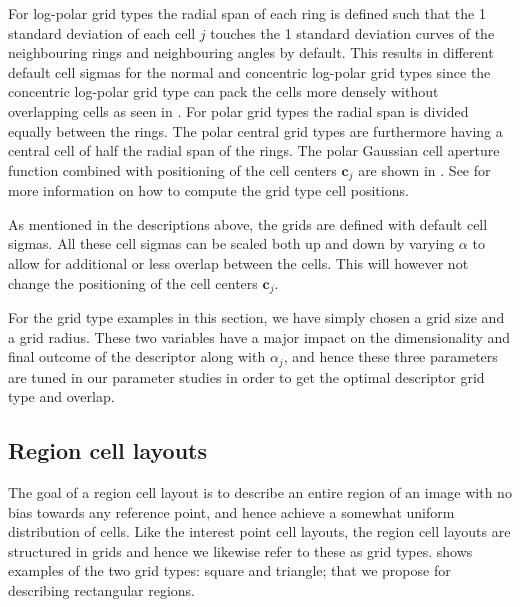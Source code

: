 \documentclass[thesis.tex]{subfiles}
\def\c{\mathbf{c}}
\begin{document}
For log-polar grid types the radial span of each ring is defined such that the 1 standard deviation of each cell $j$ touches the 1 standard deviation curves of the neighbouring rings and neighbouring angles by default. This results in different default cell sigmas for the normal and concentric log-polar grid types since the concentric log-polar grid type can pack the cells more densely without overlapping cells as seen in .
For polar grid types the radial span is divided equally between the rings. The polar central grid types are furthermore having a central cell of half the radial span of the rings. The polar Gaussian cell aperture function combined with positioning of the cell centers $\c_j$ are shown in .
See  for more information on how to compute the grid type cell positions.

As mentioned in the descriptions above, the grids are defined with default cell sigmas. All these cell sigmas can be scaled both up and down by varying $\alpha$ to allow for additional or less overlap between the cells. This will however not change the positioning of the cell centers $\c_j$.

For the grid type examples in this section, we have simply chosen a grid size and a grid radius. These two variables have a major impact on the dimensionality and final outcome of the descriptor along with $\alpha_j$, and hence these three parameters are tuned in our parameter studies in order to get the optimal descriptor grid type and overlap.

\subsection{Region cell layouts}
\label{sec:cellApertureFunctionRegion}

The goal of a region cell layout is to describe an entire region of an image with no bias towards any reference point, and hence achieve a somewhat uniform distribution of cells. Like the interest point cell layouts, the region cell layouts are structured in grids and hence we likewise refer to these as grid types.
 shows examples of the two grid types: square and triangle; that we propose for describing rectangular regions.
\end{document}
